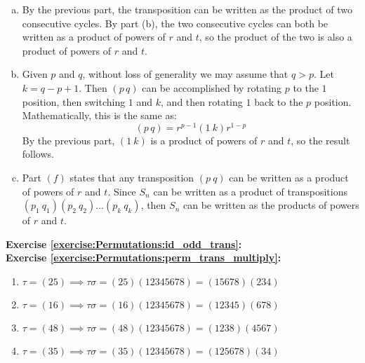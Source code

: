 \begin{enumerate}[(a)]
\item
By the previous part, the transposition can be written as the product of two consecutive cycles. By part (b), the two consecutive cycles can both be written as a  product of powers of $r$ and $t$, so the product of the two is also a product of powers of $r$ and $t$.
\item
Given $p$ and $q$, without loss of generality we may assume that $q>p$.  Let $k=q-p+1$.  Then $(p \, q)$ can be accomplished by rotating $p$ to the $1$ position, then switching $1$ and $k$, and then rotating $1$ back to the $p$ position.  Mathematically, this is the same as:
\begin{equation*}
(p \, q) = r^{p-1}(1\ k)r^{1-p}
\end{equation*}
By the previous part, $(1\ k)$ is a product of powers of $r$ and $t$, so the result follows.
\item
Part $(f)$ states that any transposition $(p\ q)$ can be written as a product of powers of $r$ and $t$. Since $S_{n}$ can be written as a product of transpositions $(p_{1}\ q_{1})(p_{2}\ q_{2})\dots(p_{k}\ q_{k})$, then $S_{n}$ can be written as the products of powers of $r$ and $t$.
\end{enumerate}

\noindent\textbf{Exercise \ref{exercise:Permutations:id_odd_trans}:}\\

\noindent\textbf{Exercise \ref{exercise:Permutations:perm_trans_multiply}:}
\begin{enumerate}[{a.}]
\item
$\tau= (25) \implies \tau\sigma = (25)(12345678) = (15678)(234)$

\item
$\tau= (16) \implies \tau\sigma = (16)(12345678) = (12345)(678)$

\item
$\tau=(48) \implies \tau\sigma = (48)(12345678) = (1238)(4567)$

\item
$\tau=(35) \implies \tau\sigma = (35)(12345678) = (125678)(34)$
\end{enumerate}

